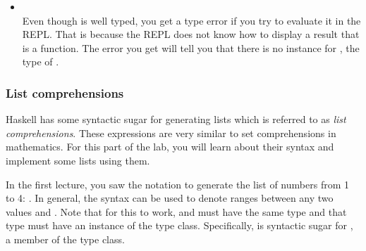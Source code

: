 \taskLine

\begin{itemize}
\item {} \\
Even though  is well typed, you get a type error if you try to evaluate it in the REPL. That is because the REPL does not know how to display a result that is a function. The error you get will tell you that there is no  instance for , the type of . 
\end{itemize}

\taskLine

\subsubsection{List comprehensions}

Haskell has some syntactic sugar for generating lists which is referred to as \emph{list comprehensions}. These expressions are very similar to set comprehensions in mathematics. For this part of the lab, you will learn about their syntax and implement some lists using them.

In the first lecture, you saw the \haskellIn{[1..4]} notation to generate the list of numbers from 1 to 4: \haskellIn{[1,2,3,4]}. In general, the \haskellIn{[n..m]} syntax can be used to denote ranges between any two values  and . Note that for this to work,  and  must have the same type and that type must have an instance of the  type class. Specifically, \haskellIn{[n..m]} is syntactic sugar for , a member of the  type class.

\taskLine


\taskLine


